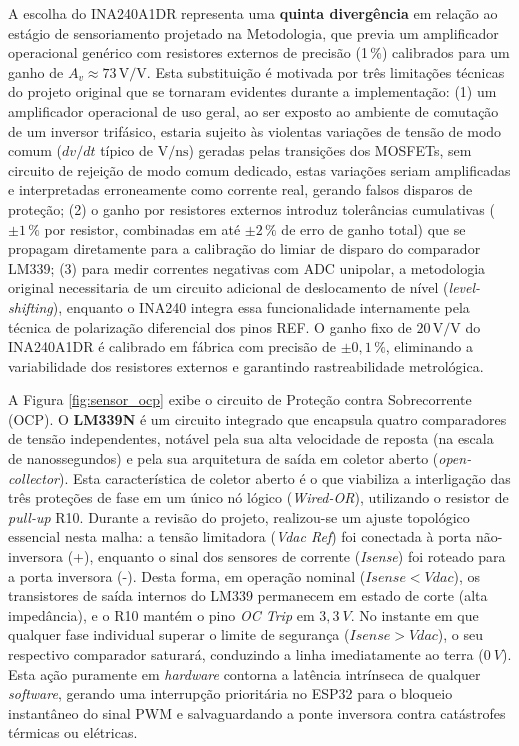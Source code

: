 A escolha do INA240A1DR representa uma \textbf{quinta divergência} em relação ao estágio de sensoriamento projetado na Metodologia, que previa um amplificador operacional genérico com resistores externos de precisão (1\,\%) calibrados para um ganho de $A_v \approx 73\,\text{V/V}$. Esta substituição é motivada por três limitações técnicas do projeto original que se tornaram evidentes durante a implementação: (1) um amplificador operacional de uso geral, ao ser exposto ao ambiente de comutação de um inversor trifásico, estaria sujeito às violentas variações de tensão de modo comum ($dv/dt$ típico de $\text{V}/\text{ns}$) geradas pelas transições dos MOSFETs, sem circuito de rejeição de modo comum dedicado, estas variações seriam amplificadas e interpretadas erroneamente como corrente real, gerando falsos disparos de proteção; (2) o ganho por resistores externos introduz tolerâncias cumulativas ($\pm 1\,\%$ por resistor, combinadas em até $\pm 2\,\%$ de erro de ganho total) que se propagam diretamente para a calibração do limiar de disparo do comparador LM339; (3) para medir correntes negativas com ADC unipolar, a metodologia original necessitaria de um circuito adicional de deslocamento de nível (\textit{level-shifting}), enquanto o INA240 integra essa funcionalidade internamente pela técnica de polarização diferencial dos pinos REF. O ganho fixo de $20\,\text{V/V}$ do INA240A1DR é calibrado em fábrica com precisão de $\pm 0{,}1\,\%$, eliminando a variabilidade dos resistores externos e garantindo rastreabilidade metrológica.

A Figura \ref{fig:sensor_ocp} exibe o circuito de Proteção contra Sobrecorrente (OCP). O \textbf{LM339N} é um circuito integrado que encapsula quatro comparadores de tensão independentes, notável pela sua alta velocidade de reposta (na escala de nanossegundos) e pela sua arquitetura de saída em coletor aberto (\textit{open-collector}). Esta característica de coletor aberto é o que viabiliza a interligação das três proteções de fase em um único nó lógico (\textit{Wired-OR}), utilizando o resistor de \textit{pull-up} R10. Durante a revisão do projeto, realizou-se um ajuste topológico essencial nesta malha: a tensão limitadora (\textit{Vdac Ref}) foi conectada à porta não-inversora (+), enquanto o sinal dos sensores de corrente (\textit{Isense}) foi roteado para a porta inversora (-). Desta forma, em operação nominal ($Isense < Vdac$), os transistores de saída internos do LM339 permanecem em estado de corte (alta impedância), e o R10 mantém o pino \textit{OC Trip} em $3,3 \: V$. No instante em que qualquer fase individual superar o limite de segurança ($Isense > Vdac$), o seu respectivo comparador saturará, conduzindo a linha imediatamente ao terra ($0 \: V$). Esta ação puramente em \textit{hardware} contorna a latência intrínseca de qualquer \textit{software}, gerando uma interrupção prioritária no ESP32 para o bloqueio instantâneo do sinal PWM e salvaguardando a ponte inversora contra catástrofes térmicas ou elétricas.

